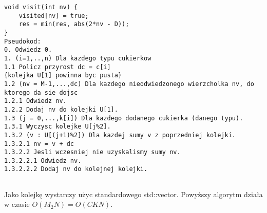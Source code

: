 \documentclass[paper=a4, fontsize=11pt]{article}
\begin{document}
\begin{lstlisting}[breaklines=True]
void visit(int nv) {
    visited[nv] = true;
    res = min(res, abs(2*nv - D));
}
Pseudokod:
0. Odwiedz 0.
1. (i=1,..,n) Dla kazdego typu cukierkow
1.1 Policz przyrost dc = c[i]
{kolejka U[1] powinna byc pusta}
1.2 (nv = M-1,...,dc) Dla kazdego nieodwiedzonego wierzcholka nv, do ktorego da sie dojsc
1.2.1 Odwiedz nv.
1.2.2 Dodaj nv do kolejki U[1].
1.3 (j = 0,...,k[i]) Dla kazdego dodanego cukierka (danego typu).
1.3.1 Wyczysc kolejke U[j%2].
1.3.2 (v : U[(j+1)%2]) Dla kazdej sumy v z poprzedniej kolejki.
1.3.2.1 nv = v + dc
1.3.2.2 Jesli wczesniej nie uzyskalismy sumy nv.
1.3.2.2.1 Odwiedz nv.
1.3.2.2.2 Dodaj nv do kolejnej kolejki.
	
\end{lstlisting}

Jako kolejkę wystarczy użyc standardowego std::vector.
Powyższy algorytm działa w czasie $O(M_2N) = O(CKN)$.
\end{document}
